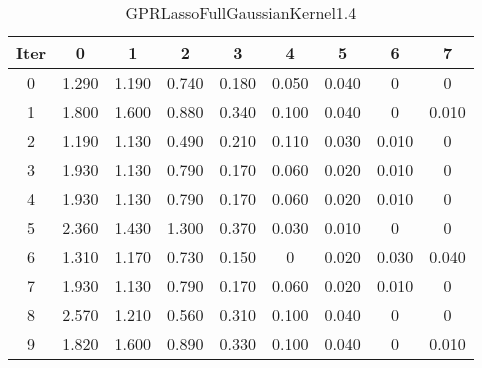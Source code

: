 \begin{table}
	\begin{center}
		\begin{tabular}{|c|c|c|c|c|c|c|c|c|}
			\hline
			Iter & 0 & 1 & 2 & 3 & 4 & 5 & 6 & 7 \\
			\hline
			0 & 1.290 & 1.190 & 0.740 & 0.180 & 0.050 & 0.040 & 0 & 0 \\
			\hline
			1 & 1.800 & 1.600 & 0.880 & 0.340 & 0.100 & 0.040 & 0 & 0.010 \\
			\hline
			2 & 1.190 & 1.130 & 0.490 & 0.210 & 0.110 & 0.030 & 0.010 & 0 \\
			\hline
			3 & 1.930 & 1.130 & 0.790 & 0.170 & 0.060 & 0.020 & 0.010 & 0 \\
			\hline
			4 & 1.930 & 1.130 & 0.790 & 0.170 & 0.060 & 0.020 & 0.010 & 0 \\
			\hline
			5 & 2.360 & 1.430 & 1.300 & 0.370 & 0.030 & 0.010 & 0 & 0 \\
			\hline
			6 & 1.310 & 1.170 & 0.730 & 0.150 & 0 & 0.020 & 0.030 & 0.040 \\
			\hline
			7 & 1.930 & 1.130 & 0.790 & 0.170 & 0.060 & 0.020 & 0.010 & 0 \\
			\hline
			8 & 2.570 & 1.210 & 0.560 & 0.310 & 0.100 & 0.040 & 0 & 0 \\
			\hline
			9 & 1.820 & 1.600 & 0.890 & 0.330 & 0.100 & 0.040 & 0 & 0.010 \\
			\hline
		\end{tabular}
	\end{center}
	\caption{GPRLassoFullGaussianKernel1.4}
\end{table}